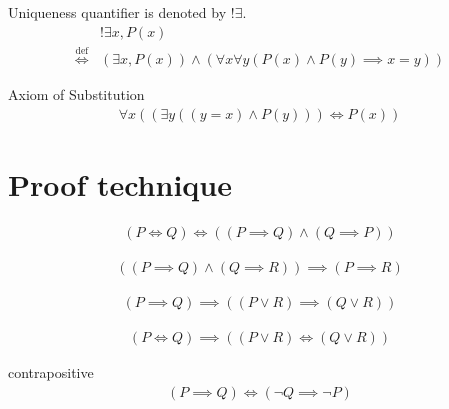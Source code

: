 \begin{defn}
\label{Definition:uniqueness_quantifier}
Uniqueness quantifier is denoted by $!\exists$.
\begin{align*}
& !\exists x, P(x) \\
\overset{\operatorname{def}}{\iff} & (\exists x, P(x)) \land (\forall x \forall y (P(x) \land P(y) \implies x = y))
\end{align*}
\end{defn}

\begin{axm}
\label{Axiom:axiom_of_substitution}
Axiom of Substitution
\begin{align*}
\forall x( (\exists y((y = x) \land P(y))) \iff P(x) )
\end{align*}
\end{axm}

\section{Proof technique}
\begin{prop}
\begin{align*}
(P \iff Q) \iff ((P \implies Q) \land (Q \implies P))
\end{align*}
\end{prop}

\begin{prop}
\begin{align*}
((P \implies Q) \land (Q \implies R)) \implies (P \implies R)
\end{align*}
\end{prop}

\begin{prop}
\label{Proposition:lor_implies_lor}
\begin{align*}
(P \implies Q) \implies ((P \lor R) \implies (Q \lor R))
\end{align*}
\end{prop}

\begin{prop}
\label{Proposition:lor_iff_lor}
\begin{align*}
(P \iff Q) \implies ((P \lor R) \iff (Q \lor R))
\end{align*}
\end{prop}

\begin{prop}
\label{Proposition:contrapositive}
contrapositive
\begin{align*}
(P \implies Q) \iff (\lnot Q \implies \lnot P)
\end{align*}
\end{prop}

